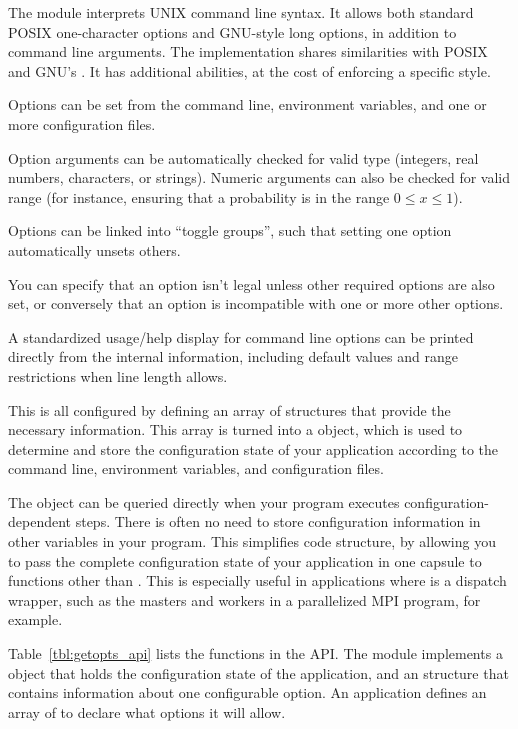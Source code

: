 
The  module interprets UNIX command line syntax. It
allows both standard POSIX one-character options and GNU-style long
options, in addition to command line arguments. The implementation
shares similarities with POSIX  and GNU's
. It has additional abilities, at the cost of
enforcing a specific style.

Options can be set from the command line, environment variables, and
one or more configuration files.

Option arguments can be automatically checked for valid type
(integers, real numbers, characters, or strings). Numeric arguments
can also be checked for valid range (for instance, ensuring that a
probability is in the range $0 \leq x \leq 1$).

Options can be linked into ``toggle groups'', such that setting one
option automatically unsets others. 

You can specify that an option isn't legal unless other required
options are also set, or conversely that an option is incompatible
with one or more other options.

A standardized usage/help display for command line options can be
printed directly from the internal information, including default
values and range restrictions when line length allows.

This is all configured by defining an array of 
structures that provide the necessary information. This array is
turned into a  object, which is used to determine
and store the configuration state of your application according to the
command line, environment variables, and configuration files.

The  object can be queried directly when your
program executes configuration-dependent steps. There is often no need
to store configuration information in other variables in your
program. This simplifies code structure, by allowing you to pass the
complete configuration state of your application in one capsule to
functions other than . This is especially useful in
applications where  is a dispatch wrapper, such as the
masters and workers in a parallelized MPI program, for example.

Table~\ref{tbl:getopts_api} lists the functions in the
 API. The module implements a 
object that holds the configuration state of the application, and an
 structure that contains information about one
configurable option. An application defines an array of
 to declare what options it will allow.

